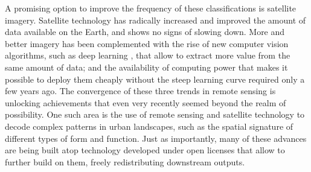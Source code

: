 A promising option to improve the frequency of these classifications is satellite
imagery.
Satellite technology has radically increased and improved the amount of data available
on the Earth, and shows no signs of slowing down.
More and better imagery has been complemented with the rise of new computer vision
algorithms, such as deep learning \citep{lecun2015}, that allow to extract more value
from the same amount of data; and the availability of computing power that makes it
possible to deploy them cheaply without the steep learning curve required only a few
years ago.
The convergence of these three trends in remote sensing is unlocking achievements that
even very recently seemed beyond the realm of possibility.
One such area is the use of remote sensing and satellite technology to decode complex
patterns in urban landscapes, such as the spatial signature of different types of form
and function.
Just as importantly, many of these advances are being built atop technology developed
under open licenses that allow to further build on them, freely redistributing
downstream outputs.

